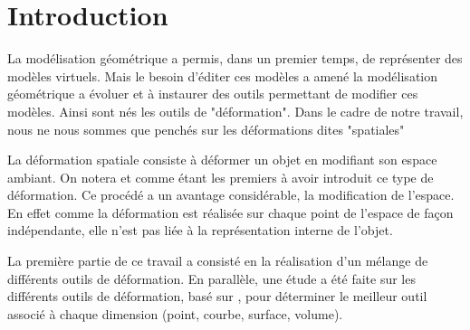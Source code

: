 \chapter{Introduction}
\ifpdf
\graphicspath{{Introduction/IntroductionFigs/PNG/}{Introduction/IntroductionFigs/PDF/}{Introduction/IntroductionFigs/}}
\else
\graphicspath{{Introduction/IntroductionFigs/EPS/}{Introduction/IntroductionFigs/}}
\fi

La modélisation géométrique a permis, dans un premier temps, de
représenter des modèles virtuels.  Mais le besoin d'éditer ces modèles
a amené la modélisation géométrique a évoluer et à instaurer des
outils permettant de modifier ces modèles.  Ainsi sont nés les outils
de "déformation". Dans le cadre de notre travail, nous ne nous sommes
que penchés sur les déformations dites "spatiales"

La déformation spatiale consiste à déformer un objet en modifiant son
espace ambiant.  On notera \cite{Bar84} et \cite{SP86} comme étant les
premiers à avoir introduit ce type de déformation.  Ce procédé a un
avantage considérable, la modification de l'espace.  En effet comme la
déformation est réalisée sur chaque point de l'espace de façon
indépendante, elle n'est pas liée à la représentation interne de
l'objet.

La première partie de ce travail a consisté en la réalisation d'un
mélange de différents outils de déformation.  En parallèle, une étude
a été faite sur les différents outils de déformation, basé sur
\cite{GB08}, pour déterminer le meilleur outil associé à chaque
dimension (point, courbe, surface, volume).



